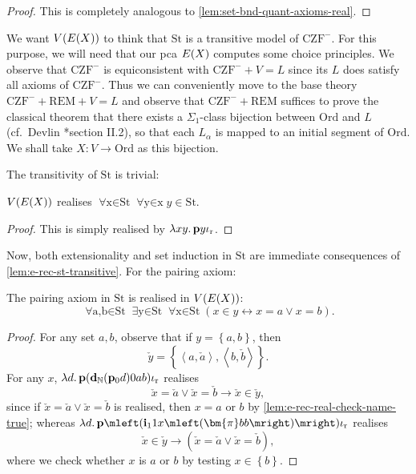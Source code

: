 \documentclass[12pt,openany]{book}
\theoremstyle{plain}
\theoremstyle{definition}
\newcommand\tuple[1]{\left\langle #1 \right\rangle}
\newcommand\opA[1]{\mathop{\forall #1}}
\newcommand\opE[1]{\mathop{\exists #1}}
\newcommand\oplam[1]{\mathop{\lambda #1.}}
\newcommand\CZF{\mathrm{CZF}}
\newcommand\REM{\mathrm{REM}}
\newcommand\Ord{\mathrm{Ord}}
\newcommand\bp{\mathbf{p}}
\newcommand\bdN{\mathbf{d}_\mathbb{N}}
\newcommand\bi{\mathbf{i}}
\newcommand\ior{\iota_\textup{r}}
\newcommand\St{\mathrm{St}}
\begin{document}
\begin{proof}
  This is completely analogous to \autoref{lem:set-bnd-quant-axioms-real}.
\end{proof}

We want $V\mleft(E\mleft(X\mright)\mright)$ to think that $\St$ is a transitive model of $\CZF^-$. For this purpose, we will need that our pca $E\mleft(X\mright)$ computes some choice principles. We observe that $\CZF^-$ is equiconsistent with $\CZF^- + V = L$ since its $L$ does satisfy all axioms of $\CZF^-$. Thus we can conveniently move to the base theory $\CZF^- + \REM + V = L$ and observe that $\CZF^- + \REM$ suffices to prove the classical theorem that there exists a $\Sigma_1$-class bijection between $\Ord$ and $L$ (cf.\ Devlin \cite{devlin84-constructibility}*{section II.2}), so that each $L_\alpha$ is mapped to an initial segment of $\Ord$. We shall take $X : V \rightarrow \Ord$ as this bijection.

The transitivity of $\St$ is trivial:
\begin{lemma}
  \label{lem:e-rec-st-transitive}
  $V\mleft(E\mleft(X\mright)\mright)$ realises $\opA{x \in \St} \opA{y \in x} y \in \St$.
\end{lemma}

\begin{proof}
  This is simply realised by $\oplam{xy} \bp y \ior$.
\end{proof}

Now, both extensionality and set induction in $\St$ are immediate consequences of \autoref{lem:e-rec-st-transitive}. For the pairing axiom:
\begin{lemma}
  The pairing axiom in $\St$ is realised in $V\mleft(E\mleft(X\mright)\mright)$:
  \[\opA{a, b \in \St} \opE{y \in \St} \opA{x \in \St} \left(x \in y \leftrightarrow x = a \lor x = b\right).\]
\end{lemma}

\begin{proof}
  For any set $a, b$, observe that if $y = \left\{a, b\right\}$, then
  \[\check{y} = \left\{\tuple{a, \check{a}}, \tuple{b, \check{b}}\right\}.\]
  For any $x$, $\oplam{d} \bp \mleft(\bdN \mleft(\bp_0 d\mright) 0ab\mright) \ior$ realises
  \[\check{x} = \check{a} \lor \check{x} = \check{b} \rightarrow \check{x} \in \check{y},\]
  since if $\check{x} = \check{a} \lor \check{x} = \check{b}$ is realised, then $x = a$ or $b$ by \autoref{lem:e-rec-real-check-name-true}; whereas $\oplam{d} \bp \mleft(\bi_1 1x \mleft(\bm{\pi} bb\mright)\mright) \ior$ realises
  \[\check{x} \in \check{y} \rightarrow \left(\check{x} = \check{a} \lor \check{x} = \check{b}\right),\]
  where we check whether $x$ is $a$ or $b$ by testing $x \in \left\{b\right\}$.
\end{proof}
\end{document}

